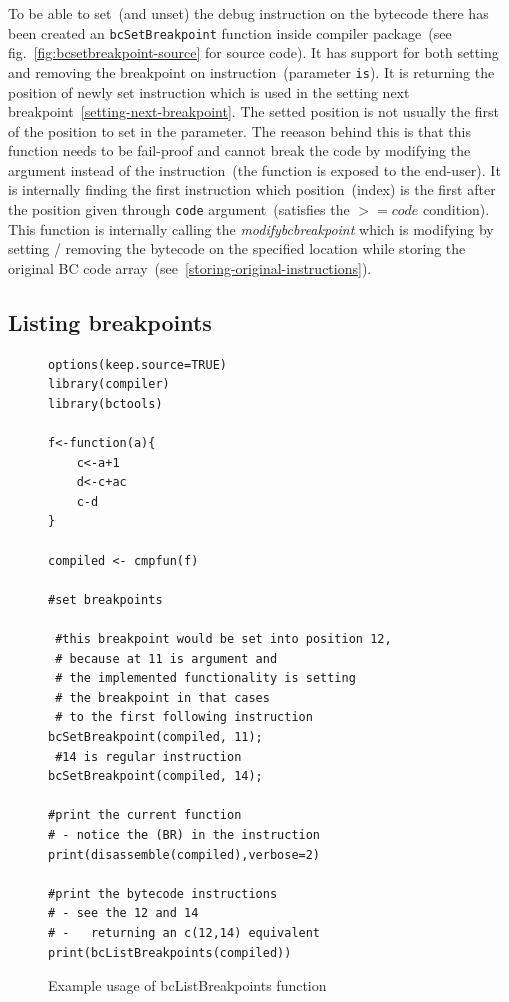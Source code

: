 \documentclass[thesis=M,english]{FITthesis}[2018/10/20]
\newcommand{\code}[1]{\texttt{#1}}
\begin{document}
To be able to set~(and unset) the debug instruction on the bytecode there has been created an \code{bcSetBreakpoint} function inside compiler package~(see fig.~\ref{fig:bcsetbreakpoint-source} for source code). It has support for both setting and removing the breakpoint on instruction~(parameter \code{is}). It is returning the position of newly set instruction which is used in the setting next breakpoint~\ref{setting-next-breakpoint}. The setted position is not usually the first of the position to set in the parameter. The reeason behind this is that this function needs to be fail-proof and cannot break the code by modifying the argument instead of the instruction~(the function is exposed to the end-user). It is internally
finding the first instruction which position~(index) is the first after the position given through \code{code} argument~(satisfies the \code{$>= code$} condition). This function is internally calling the \textit{modifybcbreakpoint} which is modifying by setting / removing the bytecode on the specified location while storing the original BC code array~(see~\ref{storing-original-instructions}).

\subsection{Listing breakpoints}\label{listing-breakpoints}

\begin{figure}[h]
\begin{lstlisting}
options(keep.source=TRUE)
library(compiler)
library(bctools)

f<-function(a){
    c<-a+1
    d<-c+ac
    c-d
}

compiled <- cmpfun(f)

#set breakpoints

 #this breakpoint would be set into position 12,
 # because at 11 is argument and
 # the implemented functionality is setting
 # the breakpoint in that cases
 # to the first following instruction
bcSetBreakpoint(compiled, 11);
 #14 is regular instruction
bcSetBreakpoint(compiled, 14);

#print the current function
# - notice the (BR) in the instruction
print(disassemble(compiled),verbose=2)

#print the bytecode instructions
# - see the 12 and 14
# -   returning an c(12,14) equivalent
print(bcListBreakpoints(compiled))
\end{lstlisting}
	\caption{Example usage of bcListBreakpoints function}\label{fig:bclistbreakpoints-example}
\end{figure}
\end{document}
